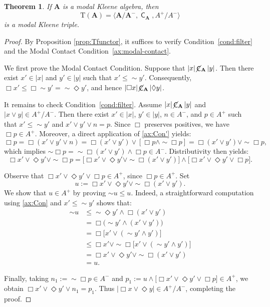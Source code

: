 \documentclass[10pt,a4paper]{amsart}
\newtheorem{theorem}{Theorem}[section]
\DeclareMathOperator{\con}{\mathsf{C}}
\DeclareMathOperator{\notcon}{\cancel{ \con}}
\newcommand{\A}{\mathbf{A}}
\begin{document}
\begin{theorem}
\label{thm:cociente-modal}
    If $\A$ is a modal Kleene algebra, then 
    \[
        \mathrm{T}(\A)=\langle \A/\A^{-}, \con_{\A},A^{+}  / A^{-} \rangle
    \]
    is a modal Kleene triple. 
\end{theorem}
\begin{proof}
    By Proposition \ref{prop:Tfunctor}, it suffices to verify Condition~\eqref{cond:filter} and the Modal Contact Condition~\eqref{ax:modal-contact}.

    We first prove the Modal Contact Condition. Suppose that $|x| \notcon_\A |y|$. Then there exist $x' \in |x|$ and $y' \in |y|$ such that $x' \leq \sim y'$. Consequently, $\Box x' \leq \Box \sim y' = \sim \Diamond y'$, and hence $|\Box x| \notcon_\A |\Diamond y|$.

    It remains to check Condition~\eqref{cond:filter}. Assume $|x| \notcon_\A |y|$ and $|x\vee y| \in A^{+}/A^{-}$. Then there exist $x' \in |x|$, $y' \in |y|$, $n \in A^{-}$, and $p \in A^{+}$ such that $x' \leq \sim y'$ and $x' \vee y' \vee n = p$. Since $\Box$ preserves positives, we have $\Box p \in A^{+}$. Moreover, a direct application of \eqref{ax:Con'} yields:
    \[
        \Box p = \Box(x'\vee y'\vee n) = \Box(x'\vee y') \vee [\Box p \wedge \sim \Box p] = \Box(x'\vee y') \vee \sim \Box p,
    \]
    which implies $\sim \Box p = \sim \Box(x'\vee y') \wedge \Box p \in A^{-}$. Distributivity then yields:
    \begin{equation*}
        \Box x' \vee \Diamond y' \vee \sim \Box p = \bigl[\Box x' \vee \Diamond y' \vee \sim \Box(x'\vee y')\bigr] \wedge \bigl[\Box x' \vee \Diamond y' \vee \Box p\bigr].
    \end{equation*}

    Observe that $\Box x' \vee \Diamond y' \vee \Box p \in A^{+}$, since $\Box p \in A^{+}$. Set 
    \[
        u := \Box x' \vee \Diamond y' \vee \sim \Box(x'\vee y').
    \]
    We show that $u \in A^{+}$ by proving $\sim u \leq u$. Indeed, a straightforward computation using \eqref{ax:Con} and $x'\leq \sim y'$ shows that:
    \begin{align*}
        \sim u &\leq \sim \Diamond y' \wedge \Box(x'\vee y') \\
        &= \Box\bigl(\sim y' \wedge (x'\vee y')\bigr) \\
        &= \Box\bigl[x' \vee (\sim y' \wedge y')\bigr] \\
        &\leq \Box x' \vee \sim \Box\bigl[x' \vee (\sim y' \wedge y')\bigr] \\
        &= \Box x' \vee \Diamond y' \vee \sim \Box(x'\vee y') \\
        &= u.
    \end{align*}

    Finally, taking $n_1 := \sim \Box p \in A^{-}$ and $p_1 := u \wedge \bigl[\Box x' \vee \Diamond y' \vee \Box p\bigr] \in A^{+}$, we obtain $\Box x' \vee \Diamond y' \vee n_1 = p_1$. Thus $|\Box x \vee \Diamond y| \in A^{+}/A^{-}$, completing the proof.
\end{proof}
\end{document}

